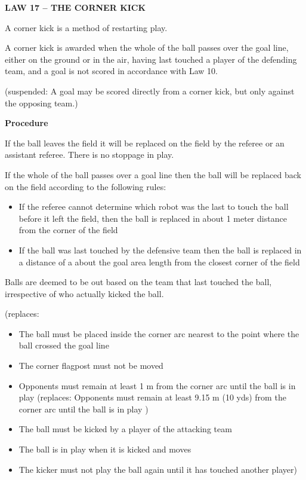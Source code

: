\clearpage
\sffamily
{\bfseries\color[rgb]{0.4,0.4,0.4}
LAW 17 -- THE CORNER KICK}


\bigskip

A corner kick is a method of restarting play.

\bigskip

A corner kick is awarded when the whole of the ball passes over the goal
line, either on the ground or in the air, having last touched a player
of the defending team, and a goal is not scored in accordance with Law
10.

\bigskip

{\color[rgb]{0.4,0.4,0.4}(suspended: A goal may be scored directly
from a corner kick, but only against the opposing team.)}

\bigskip

{\bfseries Procedure}

\headlinebox

If the ball leaves the field it will be replaced on the field by the
referee or an assistant referee. There is no stoppage in play. 

If the whole of the ball passes over a goal line then the ball will be
replaced back on the field according to the following rules: 

\begin{itemize}
\item If the referee cannot determine which robot was the last to touch
the ball before it left the field, then the ball is replaced in about 1
meter distance from the corner of the field
\item If the ball was last touched by the defensive team then the ball
is replaced in a distance of a about the goal area length from the
closest corner of the field
\end{itemize}

Balls are deemed to be out based on the team that last touched the ball,
irrespective of who actually kicked the ball. 

\bigskip

{\color[rgb]{0.4,0.4,0.4}
(replaces: 

\begin{itemize}
\item The ball must be placed inside the corner arc nearest to the point where
the ball crossed the goal line 
\item The corner flagpost must not be moved
\item Opponents must remain at least 1 m from the corner arc until the ball is
in play (replaces: Opponents must remain at least 9.15 m (10 yds) from
the corner arc until the ball is in play )
\item The ball must be kicked by a player of the attacking team
\item The ball is in play when it is kicked and moves
\item The kicker must not play the ball again until it has touched another
player)
\end{itemize}
}

